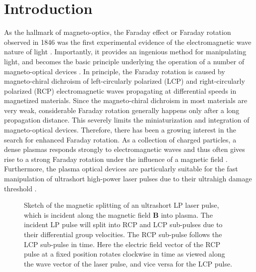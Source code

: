 \documentclass[%
aps,
preprint,
showpacs,
preprintnumbers,
 amsmath,
 amssymb,
 prl,
]{revtex4-1}
\begin{document}
\maketitle

\section{Introduction}

As the hallmark of magneto-optics, the Faraday effect or Faraday rotation observed in 1846 was the first experimental evidence of the electromagnetic wave nature of light \cite{Faraday}.
Importantly, it provides an ingenious method for manipulating light, and becomes the basic principle underlying the operation of a number of magneto-optical devices \cite{Saleh,Liu}.
In principle, the Faraday rotation is caused by magneto-chiral dichroism of left-circularly polarized (LCP) and right-circularly polarized (RCP) electromagnetic waves propagating at differential speeds in magnetized materials.
Since the magneto-chiral dichroism in most materials are very weak, considerable Faraday rotation generally happens only after a long propagation distance. This severely limits the miniaturization and integration of magneto-optical devices. Therefore, there has been a growing interest in the search for enhanced Faraday rotation.
As a collection of charged particles, a dense plasmas responds strongly to electromagnetic waves and thus often gives rise to a strong Faraday rotation under the influence of a magnetic field \cite{Chen}.
Furthermore, the plasma optical devices are particularly suitable for the fast manipulation of ultrashort high-power laser pulses due to their ultrahigh damage threshold \cite{Mourou,Thaury,YuLL,Trines}.

\begin{figure}[htbp]
\centering
{}
\caption{Sketch of the magnetic splitting of an ultrashort LP laser pulse, which is incident along the magnetic field $\textbf{B}$ into plasma. The incident LP pulse will split into RCP and LCP sub-pulses due to their differential group velocities. The RCP sub-pulse follows the LCP sub-pulse in time. Here the electric field vector of the RCP pulse at a fixed position rotates clockwise in time as viewed along the wave vector of the laser pulse, and vice versa for the LCP pulse.}
\label{figSchematic}
\end{figure}
\end{document}
